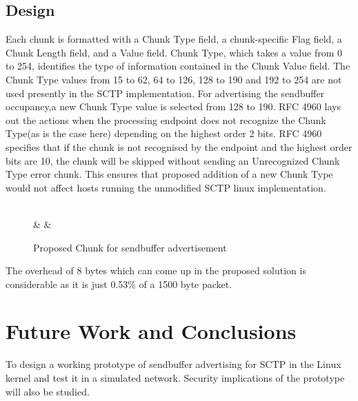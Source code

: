 \documentclass[a4paper,11pt]{article}
\begin{document}
\subsection{Design}
Each chunk is formatted with a Chunk Type field, a chunk-specific Flag field,
a Chunk Length field, and a Value field. Chunk Type, which takes a value
from 0 to 254, identifies the type of information contained in the Chunk
Value field. The Chunk Type values from 15 to 62, 64 to 126, 128 to 190 and
192 to 254 are not used presently in the SCTP implementation.
For advertising the sendbuffer occupancy,a new Chunk Type value is selected
from 128 to 190. RFC 4960 \cite{rfc4960} lays out the actions when the processing endpoint
does not recognize the Chunk Type(as is the case here) depending on
the highest order 2 bits. RFC 4960 \cite{rfc4960} specifies that if the chunk is not
recognised by the endpoint and the highest order bits are 10, the chunk
will be skipped without sending an Unrecognized Chunk Type error chunk.
This ensures that proposed addition of a new Chunk Type would not affect
hosts running the unmodified SCTP linux implementation.

\begin{figure}[h]
	\centering
	\begin{bytefield}[bitwidth=1.1em]{32}
	\\
	 &  & \\
	\end{bytefield}
	\caption{Proposed Chunk for sendbuffer advertisement}
\end{figure}

The overhead of 8 bytes which can come up in the proposed solution
is considerable as it is just 0.53\% of a 1500 byte packet.


\section{Future Work and Conclusions}
To design a working prototype of sendbuffer advertising for SCTP in the Linux
kernel and test it in a simulated network. Security implications of the
prototype will also be studied.

\printbibliography
\end{document}
